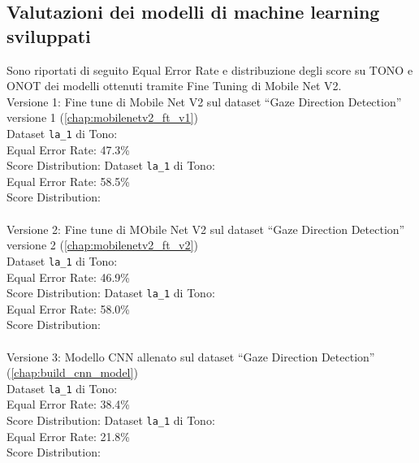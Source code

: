 \documentclass[12pt,a4paper,openright,twoside]{book}
\begin{document}
\subsection{Valutazioni dei modelli di machine learning sviluppati}
Sono riportati di seguito Equal Error Rate e distribuzione degli score su TONO e ONOT dei modelli ottenuti tramite Fine Tuning di Mobile Net V2. \\
Versione 1: Fine tune di Mobile Net V2 sul dataset ``Gaze Direction Detection'' versione 1 (\ref{chap:mobilenetv2_ft_v1}) \\
Dataset \texttt{la\_1} di Tono: \\
Equal Error Rate: 47.3\% \\
Score Distribution: 
Dataset \texttt{la\_1} di Tono: \\
Equal Error Rate: 58.5\% \\
Score Distribution:  \\
\\
Versione 2: Fine tune di MObile Net V2 sul dataset ``Gaze Direction Detection'' versione 2 (\ref{chap:mobilenetv2_ft_v2}) \\
Dataset \texttt{la\_1} di Tono: \\
Equal Error Rate: 46.9\% \\
Score Distribution: 
Dataset \texttt{la\_1} di Tono: \\
Equal Error Rate: 58.0\% \\
Score Distribution:  \\
\\
Versione 3: Modello CNN allenato sul dataset ``Gaze Direction Detection'' (\ref{chap:build_cnn_model}) \\
Dataset \texttt{la\_1} di Tono: \\
Equal Error Rate: 38.4\% \\
Score Distribution: 
Dataset \texttt{la\_1} di Tono: \\
Equal Error Rate: 21.8\% \\
Score Distribution:  \\
\end{document}
